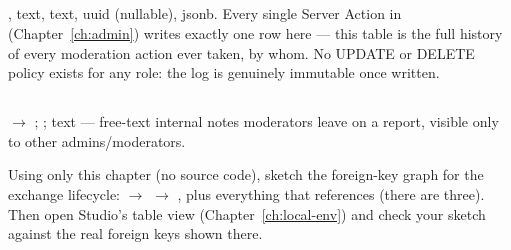 \subsection*{}
,  text,  text,  uuid (nullable),  jsonb. Every single Server Action in  (Chapter~\ref{ch:admin}) writes exactly one row here — this table is the full history of every moderation action ever taken, by whom. No UPDATE or DELETE policy exists for any role: the log is genuinely immutable once written.

\subsection*{}
 $\to$ ; ;  text — free-text internal notes moderators leave on a report, visible only to other admins/moderators.

\begin{olktask}
Using only this chapter (no source code), sketch the foreign-key graph for the exchange lifecycle:  $\to$  $\to$ , plus everything that references  (there are three). Then open Studio's table view (Chapter~\ref{ch:local-env}) and check your sketch against the real foreign keys shown there.
\end{olktask}
